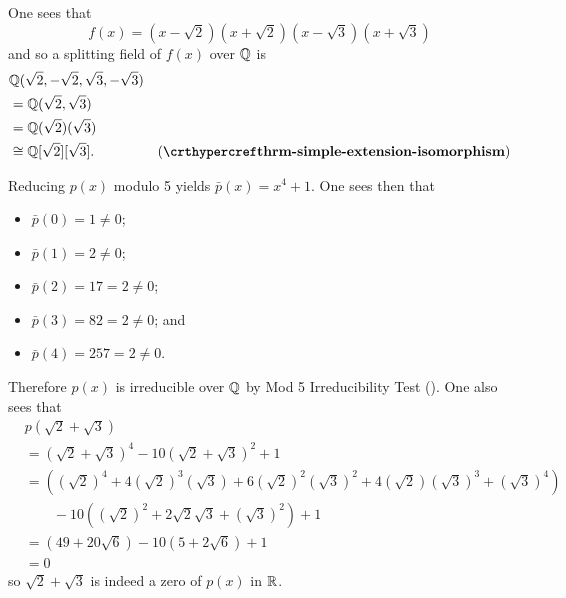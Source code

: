 \begin{questions}
    \item \begin{partquestions}{\roman*}
        \item One sees that
        \[
            f(x) = (x-\sqrt2)(x+\sqrt2)(x-\sqrt3)(x+\sqrt3)
        \]
        and so a splitting field of $f(x)$ over $\mathbb{Q}$ is
        \begin{align*}
            &\Q(\sqrt2, -\sqrt2, \sqrt3, -\sqrt3)\\
            &=\Q(\sqrt2, \sqrt3)\\
            &=\Q(\sqrt2)(\sqrt3)\\
            &\cong \Q[\sqrt2][\sqrt3]. & (\myref{thrm-simple-extension-isomorphism})
        \end{align*}

        \item Reducing $p(x)$ modulo 5 yields $\bar{p}(x) = x^4 + 1$. One sees then that
        \begin{itemize}
            \item $\bar{p}(0) = 1 \neq 0$;
            \item $\bar{p}(1) = 2 \neq 0$;
            \item $\bar{p}(2) = 17 = 2 \neq 0$;
            \item $\bar{p}(3) = 82 = 2 \neq 0$; and
            \item $\bar{p}(4) = 257 = 2 \neq 0$.
        \end{itemize}
        Therefore $p(x)$ is irreducible over $\mathbb{Q}$ by Mod 5 Irreducibility Test (). One also sees that
        \begin{align*}
            &p(\sqrt2 + \sqrt3)\\
            &= (\sqrt2 + \sqrt3)^4 - 10(\sqrt2 + \sqrt3)^2 + 1\\
            &= \left((\sqrt2)^4 + 4(\sqrt2)^3(\sqrt3) + 6(\sqrt2)^2(\sqrt3)^2 + 4(\sqrt2)(\sqrt3)^3 + (\sqrt3)^4\right)\\
            &\quad\quad- 10\left((\sqrt2)^2 + 2\sqrt2\sqrt3 + (\sqrt3)^2\right) + 1\\
            &=\left(49 + 20\sqrt6\right) - 10\left(5 + 2\sqrt6\right) + 1\\
            &= 0
        \end{align*}
        so $\sqrt2 + \sqrt3$ is indeed a zero of $p(x)$ in $\mathbb{R}$.


\end{partquestions}
\end{questions}
